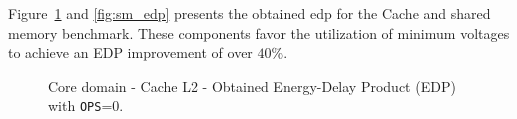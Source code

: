 Figure~\ref{fig:cache_edp} and \ref{fig:sm_edp} presents the obtained \acrshort{edp} for the Cache and shared memory benchmark. These components favor the utilization of minimum voltages to achieve an EDP improvement of over $40\%$.

\begin{figure}[!htb]
    \centering
    \begin{subfigmatrix}{2}
      \label{fig:cache_edp}
    \end{subfigmatrix}
    \caption{Core domain - Cache L2 - Obtained Energy-Delay Product (EDP) with \texttt{OPS}=0.}
\end{figure}



